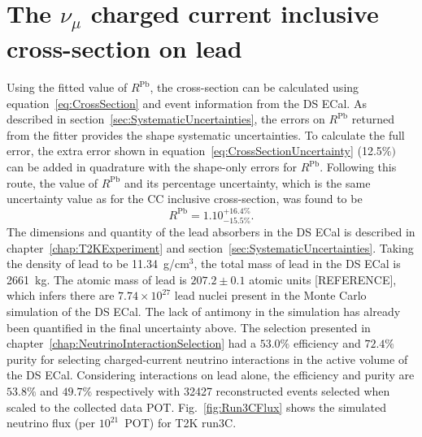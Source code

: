 \section{The $\nu_\mu$ charged current inclusive cross-section on lead}
\label{sec:PbCrossSection}
Using the fitted value of $R^{\textrm{Pb}}$, the cross-section can be calculated using equation~\ref{eq:CrossSection} and event information from the DS ECal.  As described in section~\ref{sec:SystematicUncertainties}, the errors on $R^{\textrm{Pb}}$ returned from the fitter provides the shape systematic uncertainties.  To calculate the full error, the extra error shown in equation~\ref{eq:CrossSectionUncertainty} (12.5$\%)$ can be added in quadrature with the shape-only errors for $R^{\textrm{Pb}}$.  Following this route, the value of $R^{\textrm{Pb}}$ and its percentage uncertainty, which is the same uncertainty value as for the CC inclusive cross-section, was found to be
\begin{equation}
R^{\textrm{Pb}} = 1.10^{+16.4\%}_{-15.5\%}.
\label{eq:RPbWithFullPercentageError}
\end{equation}
The dimensions and quantity of the lead absorbers in the DS ECal is described in chapter~\ref{chap:T2KExperiment} and section~\ref{sec:SystematicUncertainties}.  Taking the density of lead to be 11.34~g/cm$^{3}$, the total mass of lead in the DS ECal is 2661~kg.  The atomic mass of lead is $207.2\pm0.1$ atomic units [REFERENCE], which infers there are $7.74\times10^{27}$ lead nuclei present in the Monte Carlo simulation of the DS ECal.  The lack of antimony in the simulation has already been quantified in the final uncertainty above.
\newline
\newline
The selection presented in chapter~\ref{chap:NeutrinoInteractionSelection} had a $53.0\%$ efficiency and $72.4\%$ purity for selecting charged-current neutrino interactions in the active volume of the DS ECal.  Considering interactions on lead alone, the efficiency and purity are $53.8\%$ and $49.7\%$ respectively with 32427 reconstructed events selected when scaled to the collected data POT.
\newline
\newline
Fig.~\ref{fig:Run3CFlux} shows the simulated neutrino flux (per $10^{21}$~POT) for T2K run3C.  
